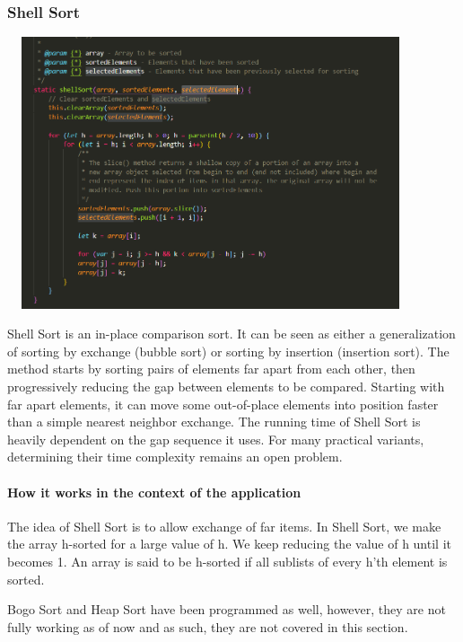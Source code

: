 \subsubsection{Shell Sort}
\begin{center}
    \includegraphics[width=12cm,height=8cm,keepaspectratio]{images/shellsort}
\end{center}
Shell Sort is an in-place comparison sort. It can be seen as either a generalization of sorting by exchange (bubble sort) or sorting by insertion (insertion sort). The method starts by sorting pairs of elements far apart from each other, then progressively reducing the gap between elements to be compared. Starting with far apart elements, it can move some out-of-place elements into position faster than a simple nearest neighbor exchange. The running time of Shell Sort is heavily dependent on the gap sequence it uses. For many practical variants, determining their time complexity remains an open problem.
\par
\bigskip

\paragraph{How it works in the context of the application}
The idea of Shell Sort is to allow exchange of far items. In Shell Sort, we make the array h-sorted for a large value of h. We keep reducing the value of h until it becomes 1. An array is said to be h-sorted if all sublists of every h’th element is sorted.
\par
\bigskip
Bogo Sort and Heap Sort have been programmed as well, however, they are not fully working as of now and as such, they are not covered in this section.

